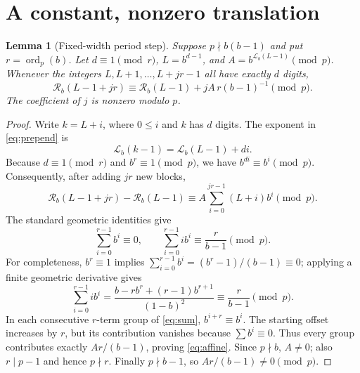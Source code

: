 \documentclass[9pt]{extarticle}
\newtheorem{lemma}{Lemma}
\newcommand{\ord}{\operatorname{ord}}
\newcommand{\len}{\mathcal{L}}
\newcommand{\rev}{\mathcal{R}}
\begin{document}
\section{A constant, nonzero translation}
\begin{lemma}[Fixed-width period step]\label{lem:shift}
Suppose $p\nmid b(b-1)$ and put $r=\ord_p(b)$.
Let $d\equiv1\pmod r$, $L=b^{d-1}$, and
$A=b^{\len_b(L-1)}\pmod p$. Whenever the integers
$L,L+1,\ldots,L+jr-1$ all have exactly $d$ digits,
\begin{equation}\label{eq:affine}
\rev_b(L-1+jr)
\equiv \rev_b(L-1)+j A\,r(b-1)^{-1}\pmod p.
\end{equation}
The coefficient of $j$ is nonzero modulo $p$.
\end{lemma}
\begin{proof}
Write $k=L+i$, where $0\le i$ and $k$ has $d$ digits.
The exponent in \eqref{eq:prepend} is
\[
\len_b(k-1)=\len_b(L-1)+di.
\]
Because $d\equiv1\pmod r$ and $b^r\equiv1\pmod p$,
we have $b^{di}\equiv b^i\pmod p$. Consequently, after adding
$j r$ new blocks,
\begin{equation}\label{eq:sum}
\rev_b(L-1+jr)-\rev_b(L-1)
\equiv A\sum_{i=0}^{jr-1}(L+i)b^i\pmod p.
\end{equation}
The standard geometric identities give
\begin{equation}\label{eq:geometric}
\sum_{i=0}^{r-1}b^i\equiv0,\qquad
\sum_{i=0}^{r-1}i b^i\equiv\frac{r}{b-1}\pmod p.
\end{equation}
For completeness, $b^r\equiv1$ implies
$\sum_{i=0}^{r-1}b^i=(b^r-1)/(b-1)\equiv0$;
applying a finite geometric derivative gives
\[
\sum_{i=0}^{r-1}i b^i
=\frac{b-rb^r+(r-1)b^{r+1}}{(1-b)^2}
\equiv\frac{r}{b-1}\pmod p.
\]
In each consecutive $r$-term group of \eqref{eq:sum},
$b^{i+r}\equiv b^i$. The starting offset increases by $r$,
but its contribution vanishes because $\sum b^i\equiv0$.
Thus every group contributes exactly $Ar/(b-1)$, proving
\eqref{eq:affine}. Since $p\nmid b$, $A\ne0$; also
$r\mid p-1$ and hence $p\nmid r$. Finally $p\nmid b-1$,
so $Ar/(b-1)\ne0\pmod p$.
\end{proof}
\end{document}
